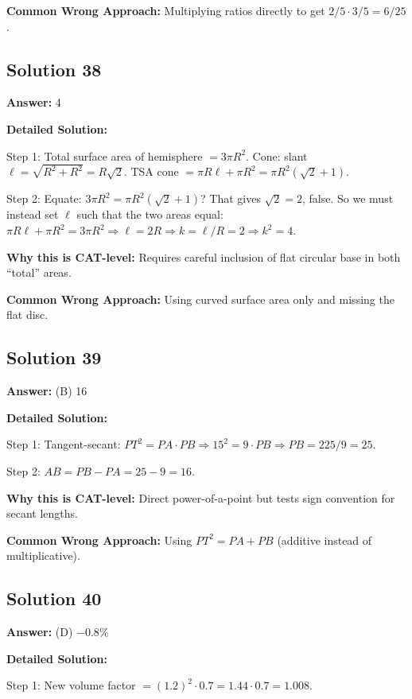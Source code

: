 \documentclass[11pt]{article}
\begin{document}
\textbf{Common Wrong Approach:} Multiplying ratios directly to get \(2/5 \cdot 3/5 = 6/25\).

\subsection*{Solution 38}
\textbf{Answer:} 4

\textbf{Detailed Solution:}

Step 1: Total surface area of hemisphere \(= 3\pi R^2\). Cone: slant \(\ell=\sqrt{R^2+R^2}=R\sqrt 2\). TSA cone \(=\pi R\ell + \pi R^2 = \pi R^2(\sqrt 2 + 1)\).

Step 2: Equate: \(3\pi R^2 = \pi R^2(\sqrt 2 + 1)\)? That gives \(\sqrt 2 = 2\), false. So we must instead set \(\ell\) such that the two areas equal: \(\pi R \ell + \pi R^2 = 3\pi R^2 \Rightarrow \ell = 2R \Rightarrow k = \ell/R = 2 \Rightarrow k^2=4\).

\textbf{Why this is CAT-level:} Requires careful inclusion of flat circular base in both ``total'' areas.

\textbf{Common Wrong Approach:} Using curved surface area only and missing the flat disc.

\subsection*{Solution 39}
\textbf{Answer:} (B) 16

\textbf{Detailed Solution:}

Step 1: Tangent-secant: \(PT^2 = PA \cdot PB \Rightarrow 15^2 = 9 \cdot PB \Rightarrow PB = 225/9 = 25\).

Step 2: \(AB = PB - PA = 25 - 9 = 16\).

\textbf{Why this is CAT-level:} Direct power-of-a-point but tests sign convention for secant lengths.

\textbf{Common Wrong Approach:} Using \(PT^2 = PA + PB\) (additive instead of multiplicative).

\subsection*{Solution 40}
\textbf{Answer:} (D) \(-0.8\%\)

\textbf{Detailed Solution:}

Step 1: New volume factor \(=(1.2)^2 \cdot 0.7 = 1.44 \cdot 0.7 = 1.008\).
\end{document}
